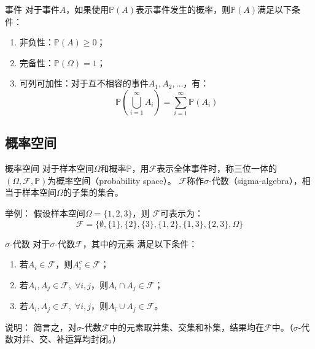 \documentclass[t]{beamer}
\renewcommand{\Pr}{\mathbb{P}}
\begin{document}
  \begin{frame}{事件}
    对于事件$A$，如果使用$\Pr(A)$表示事件发生的概率，则$\Pr(A)$满足以下条件：
    \begin{enumerate}
      \item 非负性：$\Pr(A)\ge 0$；
      \item 完备性：$\Pr(\Omega)=1$；
      \item 可列可加性：对于互不相容的事件$A_1,A_2,\ldots$，有：
      \begin{equation*}
    \Pr\left(\bigcup^{\infty}_{i=1}A_i\right)=\sum^{\infty}_{i=1}\Pr(A_i)
      \end{equation*}
    \end{enumerate}
  
  \end{frame}
  \subsection{概率空间}
  \begin{frame}{概率空间}
    对于样本空间$\Omega$和概率$\Pr$，用$\mathcal{F}$表示全体事件时，称三位一体的$(\Omega,\mathcal{F},\Pr)$为概率空间（probability
    space）。
    $\mathcal{F}$称作$\sigma$-代数（sigma-algebra），相当于样本空间$\Omega$的子集的集合。
  
    \begin{block}{举例：}
      假设样本空间$\Omega=\{1,2,3\}$，则
$\mathcal{F}$可表示为：
\begin{equation*}\mathcal{F}=\Big\{\emptyset,
\{1\},\{2\},\{3\},\{1,2\}, \{1,3\},\{2,3\},\Omega\Big\}
\end{equation*}
    \end{block}
  \end{frame}




  \begin{frame}{$\sigma$-代数}
    对于$\sigma$-代数$\mathcal{F}$，其中的元素 满足以下条件：
    \begin{enumerate}
      \item 若$A_i\in \mathcal{F}$，则$A_i^c\in \mathcal{F}$；
    \item 若$A_i,A_j\in \mathcal{F},\;\forall i,j$，则$A_i\cap A_j\in
    \mathcal{F}$；
    \item 若$A_i,A_j\in \mathcal{F},\;\forall i,j$，则$A_i\cup A_j\in
    \mathcal{F}$。
    \end{enumerate}
  
    \begin{block}{说明：}
      简言之，对$\sigma$-代数$\mathcal{F}$中的元素取并集、交集和补集，结果均在$\mathcal{F}$中。（$\sigma$-代数对并、交、补运算均封闭。）
    \end{block}


  \end{frame}
\end{document}
